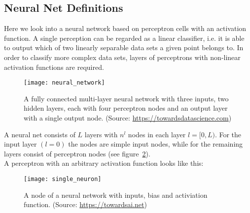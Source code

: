 \subsection{Neural Net Definitions}

Here we look into a neural network based on perceptron cells with an activation function.
A single perception can be regarded as a linear classifier, i.e. it is able to output
which of two linearly separable data sets a given point belongs to. In order to classify
more complex data sets, layers of perceptrons with non-linear activation functions are
required.

\begin{figure}[h] \centering \texttt{[image: neural\_network]}
    \caption{A fully connected multi-layer neural network with three inputs, two hidden
    layers, each with four perceptron nodes and an output layer with a single output node.
    (Source: \url{https://towardsdatascience.com})} \label{fig:neural_network}
\end{figure}

A neural net consists of $L$ layers with $n^l$ nodes in each layer $l=[0,L)$. For the
input layer $(l=0)$ the nodes are simple input nodes, while for the remaining layers
consist of perceptron nodes (see figure~\ref{fig:percptron}). \\

A perceptron with an arbitrary activation function looks like this:
\begin{figure}[h] \centering \texttt{[image: single\_neuron]}
    \caption{A node of a neural network with inputs, bias and activiation function.
    (Source: \url{https://towardsai.net})}
    \label{fig:percptron}
\end{figure}

